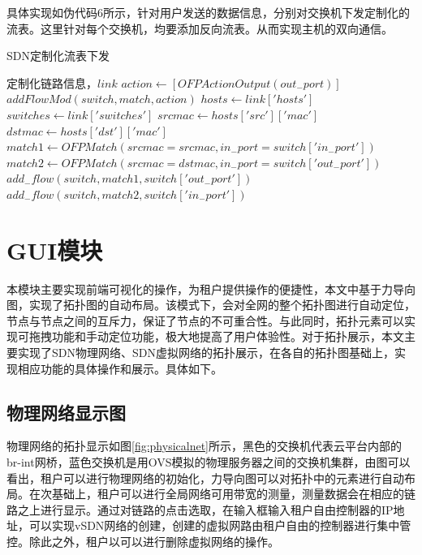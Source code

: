 具体实现如伪代码6所示，针对用户发送的数据信息，分别对交换机下发定制化的流表。这里针对每个交换机，均要添加反向流表。从而实现主机的双向通信。

\begin{algorithm}[!htb]
    \caption{SDN定制化流表下发}
    \begin{algorithmic}[1] %
        \Require 定制化链路信息，$link$
        	\State $action \gets [OFPActionOutput(out_{-}port)]$
        	\State $addFlowMod(switch,match,action)$
        	\State 
        \EndFunction
        	\State $hosts \gets link['hosts']$
        	\State $switches \gets link['switches']$
        	\State $srcmac \gets hosts['src']['mac']$
        	\State $dstmac \gets hosts['dst']['mac']$
        		\State $match1 \gets OFPMatch(srcmac=srcmac,in_{-}port=switch['in_{-}port'])$
        		\State $match2 \gets OFPMatch(srcmac=dstmac,in_{-}port=switch['out_{-}port'])$
            	\State $add_{-}flow(switch,match1,switch['out_{-}port'])$
            	\State $add_{-}flow(switch,match2,switch['in_{-}port'])$
            \EndFor        	
        \EndFunction
    \end{algorithmic}
\end{algorithm}

\section{GUI模块}
本模块主要实现前端可视化的操作，为租户提供操作的便捷性，本文中基于力导向图，实现了拓扑图的自动布局。该模式下，会对全网的整个拓扑图进行自动定位，节点与节点之间的互斥力，保证了节点的不可重合性。与此同时，拓扑元素可以实现可拖拽功能和手动定位功能，极大地提高了用户体验性。对于拓扑展示，本文主要实现了SDN物理网络、SDN虚拟网络的拓扑展示，在各自的拓扑图基础上，实现相应功能的具体操作和展示。具体如下。

\subsection{物理网络显示图}
物理网络的拓扑显示如图\ref{fig:physicalnet}所示，黑色的交换机代表云平台内部的br-int网桥，蓝色交换机是用OVS模拟的物理服务器之间的交换机集群，由图可以看出，租户可以进行物理网络的初始化，力导向图可以对拓扑中的元素进行自动布局。在次基础上，租户可以进行全局网络可用带宽的测量，测量数据会在相应的链路之上进行显示。通过对链路的点击选取，在输入框输入租户自由控制器的IP地址，可以实现vSDN网络的创建，创建的虚拟网路由租户自由的控制器进行集中管控。除此之外，租户以可以进行删除虚拟网络的操作。

